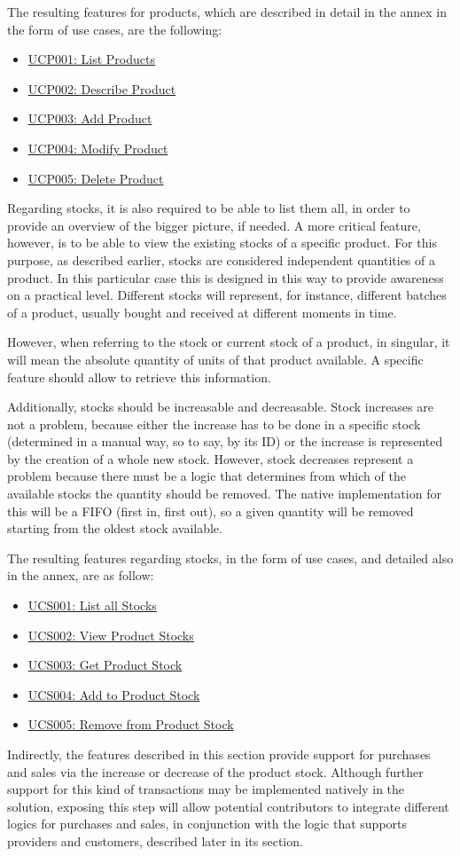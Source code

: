 The resulting features for products, which are described in detail in the annex in the form of use cases, are the following:
\hfill\break
\begin{itemize}
\item \hyperref[UCP001]{UCP001: List Products}
\item \hyperref[UCP002]{UCP002: Describe Product}
\item \hyperref[UCP003]{UCP003: Add Product}
\item \hyperref[UCP004]{UCP004: Modify Product}
\item \hyperref[UCP005]{UCP005: Delete Product}
\end{itemize}
\hfill\break
Regarding stocks, it is also required to be able to list them all, in order to provide an overview of the bigger picture, if needed. A more critical feature, however, is to be able to view the existing stocks of a specific product. For this purpose, as described earlier, stocks are considered independent quantities of a product. In this particular case this is designed in this way to provide awareness on a practical level. Different stocks will represent, for instance, different batches of a product, usually bought and received at different moments in time.

However, when referring to the stock or current stock of a product, in singular, it will mean the absolute quantity of units of that product available. A specific feature should allow to retrieve this information.

Additionally, stocks should be increasable and decreasable. Stock increases are not a problem, because either the increase has to be done in a specific stock (determined in a manual way, so to say, by its ID) or the increase is represented by the creation of a whole new stock. However, stock decreases represent a problem because there must be a logic that determines from which of the available stocks the quantity should be removed. The native implementation for this will be a FIFO (first in, first out), so a given quantity will be removed starting from the oldest stock available.

The resulting features regarding stocks, in the form of use cases, and detailed also in the annex, are as follow:
\hfill\break
\begin{itemize}
\item \hyperref[UCS001]{UCS001: List all Stocks}
\item \hyperref[UCS002]{UCS002: View Product Stocks}
\item \hyperref[UCS003]{UCS003: Get Product Stock}
\item \hyperref[UCS004]{UCS004: Add to Product Stock}
\item \hyperref[UCS005]{UCS005: Remove from Product Stock}
\end{itemize}
\hfill\break
Indirectly, the features described in this section provide support for purchases and sales via the increase or decrease of the product stock. Although further support for this kind of transactions may be implemented natively in the solution, exposing this step will allow potential contributors to integrate different logics for purchases and sales, in conjunction with the logic that supports providers and customers, described later in its section.

